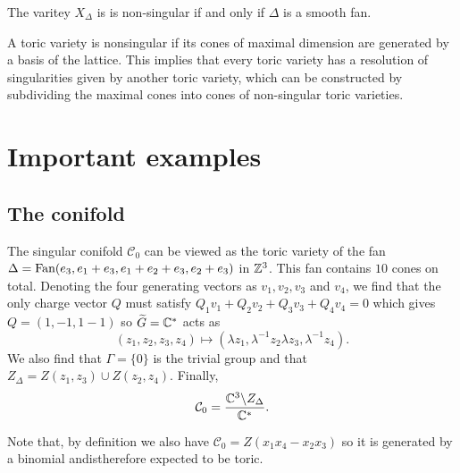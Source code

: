         \begin{prop*}
            The varitey $X_\Delta$ is is non-singular if and only if $\Delta$ is a smooth fan.
        \end{prop*}


        A toric variety is nonsingular if its cones of maximal dimension are generated by a basis of the lattice. This implies that every toric variety has a resolution of singularities given by another toric variety, which can be constructed by subdividing the maximal cones into cones of non-singular toric varieties.

\section{Important examples}
    
    \subsection{The conifold}

        The singular conifold $\mathcal{C}_0$ can be viewed as the toric variety of the fan $\Delta=\text{Fan}(e_3,e_1+e_3,e_1+e_2+e_3,e_2+e_3)$ in $\mathbb{Z}^3$. This fan contains $10$ cones on total. Denoting the four generating vectors as $v_1,v_2,v_3$ and $v_4$, we find that the only charge vector $Q$ must satisfy $Q_1v_1+Q_2v_2+Q_3v_3+Q_4v_4=0$ which gives $Q=(1,-1,1-1)$ so $\widetilde{G}=\mathbb{C}^*$ acts as
        \begin{equation}
            (z_1,z_2,z_3,z_4)\mapsto (\lambda z_1,\lambda^{-1} z_2\lambda z_3,\lambda^{-1} z_4).
        \end{equation}
        We also find that $\Gamma=\{0\}$ is the trivial group and that $Z_\Delta=Z(z_1,z_3)\cup Z(z_2,z_4)$. Finally,
        \begin{equation}
            \mathcal{C}_0=\frac{\mathbb{C}^3\backslash Z_\Delta}{\mathbb{C}^*}.
        \end{equation}

        Note that, by definition we also have $\mathcal{C}_0=Z(x_1x_4-x_2x_3)$ so it is generated by a binomial andistherefore expected to be toric. 

